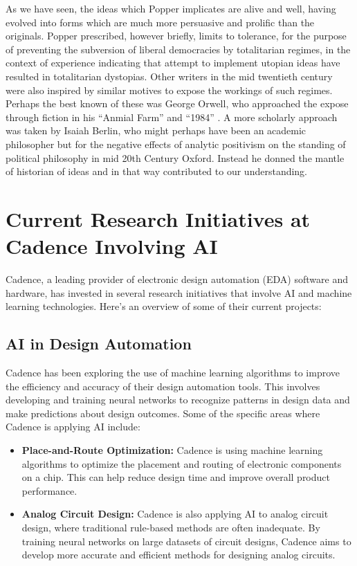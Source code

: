 \documentclass[10pt,titlepage]{book}
\begin{document}
As we have seen, the ideas which Popper implicates are alive and well, having evolved into forms which are much more persuasive and prolific than the originals.
Popper prescribed, however briefly, limits to tolerance, for the purpose of preventing the subversion of liberal democracies by totalitarian regimes, in the context of experience indicating that attempt to implement utopian ideas have resulted in totalitarian dystopias.
Other writers in the mid twentieth century were also inspired by similar motives to expose the workings of such regimes.
Perhaps the best known of these was George Orwell, who approached the expose through fiction in his ``Anmial Farm'' and ``1984'' \cite{orwell-af,orwell-1984,orwell-fd}.
A more scholarly approach was taken by Isaiah Berlin, who might perhaps have been an academic philosopher but for the negative effects of analytic positivism on the standing of political philosophy in mid 20th Century Oxford.
Instead he donned the mantle of historian of ideas and in that way contributed to our understanding.
 
\backmatter

\appendix
\section{Current Research Initiatives at Cadence Involving AI}

Cadence, a leading provider of electronic design automation (EDA) software and hardware, has invested in several research initiatives that involve AI and machine learning technologies. Here's an overview of some of their current projects:

\subsection{AI in Design Automation}

Cadence has been exploring the use of machine learning algorithms to improve the efficiency and accuracy of their design automation tools. This involves developing and training neural networks to recognize patterns in design data and make predictions about design outcomes. Some of the specific areas where Cadence is applying AI include:

\begin{itemize}
\item \textbf{Place-and-Route Optimization:} Cadence is using machine learning algorithms to optimize the placement and routing of electronic components on a chip. This can help reduce design time and improve overall product performance.

\item \textbf{Analog Circuit Design:} Cadence is also applying AI to analog circuit design, where traditional rule-based methods are often inadequate. By training neural networks on large datasets of circuit designs, Cadence aims to develop more accurate and efficient methods for designing analog circuits.
\end{itemize}
\end{document}
